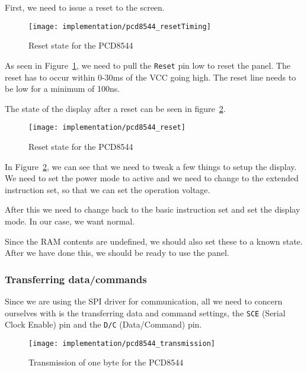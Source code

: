 First, we need to issue a reset to the screen.

\begin{figure}
	\centering
	\texttt{[image: implementation/pcd8544\_resetTiming]}
	\caption{Reset state for the PCD8544\cite[21]{philips:pcd8544}}
	\label{fig:pcd8544_resetTiming}
\end{figure}

As seen in Figure~\ref{fig:pcd8544_resetTiming}, we need to pull the \texttt{Reset} pin low to reset the panel. The reset has to occur within 0-30ms of the VCC going high\cite[20]{philips:pcd8544}. The reset line needs to be low for a minimum of 100ns\cite[20]{philips:pcd8544}.

The state of the display after a reset can be seen in figure~\ref{fig:pcd8544_reset}.

\begin{figure}
	\centering
	\texttt{[image: implementation/pcd8544\_reset]}
	\caption{Reset state for the PCD8544\cite[15]{philips:pcd8544}}
	\label{fig:pcd8544_reset}
\end{figure}

In Figure~\ref{fig:pcd8544_reset}, we can see that we need to tweak a few things to setup the display. We need to set the power mode to active and we need to change to the extended instruction set, so that we can set the operation voltage.

After this we need to change back to the basic instruction set and set the display mode. In our case, we want normal.

Since the RAM contents are undefined, we should also set these to a known state. After we have done this, we should be ready to use the panel.

\subsubsection{Transferring data/commands}

Since we are using the SPI driver for communication, all we need to concern ourselves with is the transferring data and command settings, the \texttt{SCE} (Serial Clock Enable) pin and the \texttt{D/C} (Data/Command) pin.

\begin{figure}
	\centering
	\texttt{[image: implementation/pcd8544\_transmission]}
	\caption{Transmission of one byte for the PCD8544\cite[p. 12]{philips:pcd8544}}
	\label{fig:pcd8544_transmission}
\end{figure}

